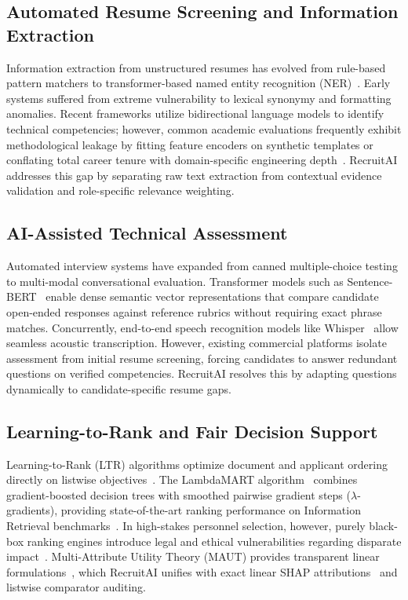 \documentclass[conference]{IEEEtran}
\begin{document}
\subsection{Automated Resume Screening and Information Extraction}
Information extraction from unstructured resumes has evolved from rule-based pattern matchers to transformer-based named entity recognition (NER)~\cite{devlin2019bert}. Early systems suffered from extreme vulnerability to lexical synonymy and formatting anomalies. Recent frameworks utilize bidirectional language models to identify technical competencies; however, common academic evaluations frequently exhibit methodological leakage by fitting feature encoders on synthetic templates or conflating total career tenure with domain-specific engineering depth~\cite{sackett2022revisiting}. RecruitAI addresses this gap by separating raw text extraction from contextual evidence validation and role-specific relevance weighting.

\subsection{AI-Assisted Technical Assessment}
Automated interview systems have expanded from canned multiple-choice testing to multi-modal conversational evaluation. Transformer models such as Sentence-BERT~\cite{reimers2019sentence} enable dense semantic vector representations that compare candidate open-ended responses against reference rubrics without requiring exact phrase matches. Concurrently, end-to-end speech recognition models like Whisper~\cite{radford2023robust} allow seamless acoustic transcription. However, existing commercial platforms isolate assessment from initial resume screening, forcing candidates to answer redundant questions on verified competencies. RecruitAI resolves this by adapting questions dynamically to candidate-specific resume gaps.

\subsection{Learning-to-Rank and Fair Decision Support}
Learning-to-Rank (LTR) algorithms optimize document and applicant ordering directly on listwise objectives~\cite{burges2010ranknet}. The LambdaMART algorithm~\cite{ke2017lightgbm} combines gradient-boosted decision trees with smoothed pairwise gradient steps ($\lambda$-gradients), providing state-of-the-art ranking performance on Information Retrieval benchmarks~\cite{jarvelin2002cumulated}. In high-stakes personnel selection, however, purely black-box ranking engines introduce legal and ethical vulnerabilities regarding disparate impact~\cite{hardt2016equality, zehlike2017fair}. Multi-Attribute Utility Theory (MAUT) provides transparent linear formulations~\cite{saaty1980analytic}, which RecruitAI unifies with exact linear SHAP attributions~\cite{lundberg2017unified} and listwise comparator auditing.
\end{document}
